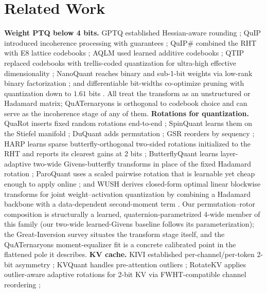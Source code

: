 \documentclass{article}
\begin{document}
\section{Related Work}
\label{sec:related}

\textbf{Weight PTQ below 4 bits.} GPTQ established Hessian-aware rounding
\citep{frantar2023gptq}; QuIP introduced incoherence processing with guarantees
\citep{chee2023quip}; QuIP\# combined the RHT with E8 lattice codebooks
\citep{tseng2024quipsharp}; AQLM used learned additive codebooks
\citep{egiazarian2024aqlm}; QTIP replaced codebooks with trellis-coded
quantization for ultra-high effective dimensionality \citep{tseng2024qtip};
NanoQuant reaches binary and sub-1-bit weights via low-rank binary
factorization \citep{chong2026nanoquant}; and differentiable bit-widths
co-optimize pruning with quantization down to $1.61$ bits
\citep{kang2026diffbitwidth}.
All treat the transform as an unstructured or Hadamard matrix; QuATernaryons
is orthogonal to codebook choice and can serve as the incoherence stage of any
of them. \textbf{Rotations for quantization.} QuaRot inserts fixed random
rotations end-to-end \citep{ashkboos2024quarot}; SpinQuant learns them on the
Stiefel manifold \citep{liu2024spinquant}; DuQuant adds permutation
\citep{lin2024duquant}; GSR reorders by sequency \citep{choi2025gsr}; HARP learns sparse
butterfly-orthogonal two-sided rotations initialized to the RHT and reports its
clearest gains at 2 bits \citep{zagitov2026harp}; ButterflyQuant learns
layer-adaptive two-wide Givens-butterfly transforms in place of the fixed
Hadamard rotation \citep{xu2025butterflyquant}; ParoQuant uses a scaled
pairwise rotation that is learnable yet cheap enough to apply online
\citep{liang2026paroquant}; and WUSH derives closed-form optimal linear
blockwise transforms for joint weight--activation quantization by combining a
Hadamard backbone with a data-dependent second-moment term
\citep{chen2026wush}. Our permutation--rotor
composition is structurally a learned, quaternion-parametrized 4-wide member of
this family (our two-wide learned-Givens baseline follows its
parameterization); the Great-Inversion survey \citep{jokar2026inversion} situates the
transform stage itself, and the QuATernaryons moment-equalizer fit is a concrete
calibrated point in the flattened pole it describes. \textbf{KV cache.} KIVI established per-channel/per-token 2-bit
asymmetry \citep{liu2024kivi}; KVQuant handles pre-attention outliers
\citep{hooper2024kvquant}; RotateKV applies outlier-aware adaptive rotations
for 2-bit KV via FWHT-compatible channel reordering \citep{su2025rotatekv};
\end{document}
